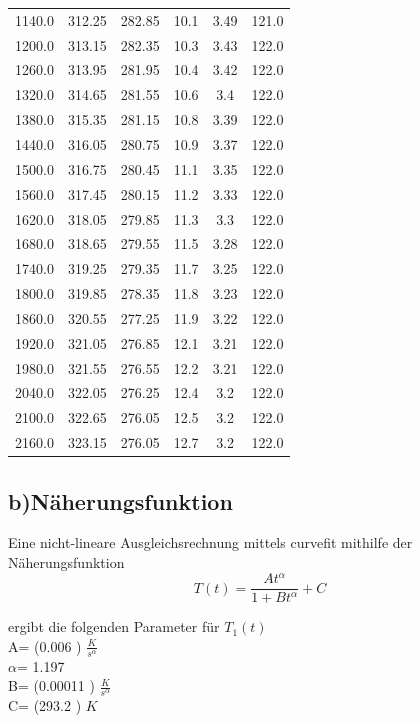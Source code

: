 \begin{table}
\begin{tabular}{cccccc}
1140.0 & 312.25 & 282.85 & 10.1 & 3.49 & 121.0 \\
1200.0 & 313.15 & 282.35 & 10.3 & 3.43 & 122.0 \\
1260.0 & 313.95 & 281.95 & 10.4 & 3.42 & 122.0 \\
1320.0 & 314.65 & 281.55 & 10.6 & 3.4 & 122.0 \\
1380.0 & 315.35 & 281.15 & 10.8 & 3.39 & 122.0 \\
1440.0 & 316.05 & 280.75 & 10.9 & 3.37 & 122.0 \\
1500.0 & 316.75 & 280.45 & 11.1 & 3.35 & 122.0 \\
1560.0 & 317.45 & 280.15 & 11.2 & 3.33 & 122.0 \\
1620.0 & 318.05 & 279.85 & 11.3 & 3.3 & 122.0 \\
1680.0 & 318.65 & 279.55 & 11.5 & 3.28 & 122.0 \\
1740.0 & 319.25 & 279.35 & 11.7 & 3.25 & 122.0 \\
1800.0 & 319.85 & 278.35 & 11.8 & 3.23 & 122.0 \\
1860.0 & 320.55 & 277.25 & 11.9 & 3.22 & 122.0 \\
1920.0 & 321.05 & 276.85 & 12.1 & 3.21 & 122.0 \\
1980.0 & 321.55 & 276.55 & 12.2 & 3.21 & 122.0 \\
2040.0 & 322.05 & 276.25 & 12.4 & 3.2 & 122.0 \\
2100.0 & 322.65 & 276.05 & 12.5 & 3.2 & 122.0 \\
2160.0 & 323.15 & 276.05 & 12.7 & 3.2 & 122.0 \\
\bottomrule
\end{tabular}
\end{table}
\newpage
\subsection{b)Näherungsfunktion}
Eine nicht-lineare Ausgleichsrechnung mittels curvefit mithilfe der Näherungsfunktion
\begin{equation}
\label{eqn:naeherungsfunktion}
T(t)=\frac{At^\alpha}{1+Bt^\alpha}+C
\end{equation}

ergibt die folgenden Parameter
für $T_1(t)$\\

A= (0.006 ) $\frac{K}{s^\alpha}$ \\
$\alpha$= 1.197  \\
B= (0.00011 ) $\frac{K}{s^\alpha}$\\
C= (293.2 ) $K$ \\

